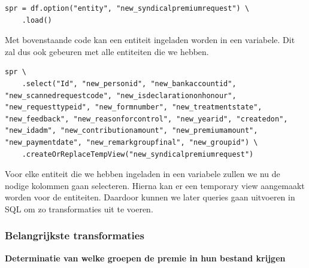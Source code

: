 
\begin{verbatim}
spr = df.option("entity", "new_syndicalpremiumrequest") \
    .load()
\end{verbatim}

Met bovenstaande code kan een entiteit ingeladen worden in een variabele. Dit zal dus ook gebeuren met alle entiteiten die we hebben.


\begin{verbatim}
spr \
    .select("Id", "new_personid", "new_bankaccountid", "new_scannedrequestcode", "new_isdeclarationonhonour", "new_requesttypeid", "new_formnumber", "new_treatmentstate", "new_feedback", "new_reasonforcontrol", "new_yearid", "createdon", "new_idadm", "new_contributionamount", "new_premiumamount", "new_paymentdate", "new_remarkgroupfinal", "new_groupid") \
    .createOrReplaceTempView("new_syndicalpremiumrequest")
\end{verbatim}

Voor elke entiteit die we hebben ingeladen in een variabele zullen we nu de nodige kolommen gaan selecteren. Hierna kan er een temporary view aangemaakt worden voor de entiteiten. Daardoor kunnen we later queries gaan uitvoeren in SQL om zo transformaties uit te voeren.

\subsubsection{Belangrijkste transformaties}

\textbf{Determinatie van welke groepen de premie in hun bestand krijgen}

